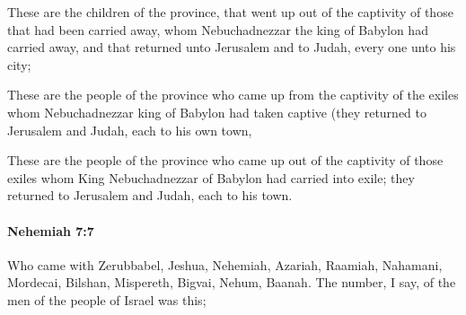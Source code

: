 			\begin{versebox}
					\item[BHS] 
					\item[LXX] 
					\item[ASV] These are the children of the province, that went up out of the captivity of those that had been carried away, whom Nebuchadnezzar the king of Babylon had carried away, and that returned unto Jerusalem and to Judah, every one unto his city;
					\item[NIV] These are the people of the province who came up from the captivity of the exiles whom Nebuchadnezzar king of Babylon had taken captive (they returned to Jerusalem and Judah, each to his own town,
					\item[NRSV] These are the people of the province who came up out of the captivity of those exiles whom King Nebuchadnezzar of Babylon had carried into exile; they returned to Jerusalem and Judah, each to his town.
			\end{versebox}

		\paragraph{Nehemiah 7:7} %
			\label{NEHEMIAH-7-7}

			Who came with Zerubbabel, Jeshua, Nehemiah, Azariah, Raamiah, Nahamani, Mordecai, Bilshan, Mispereth, Bigvai, Nehum, Baanah. The number, I say, of the men of the people of Israel was this;

